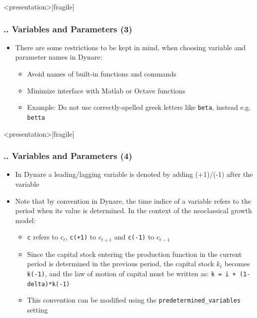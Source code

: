 \documentclass[11pt,aspectratio=169]{beamer}
\begin{document}
\begin{frame}<presentation>[fragile]
	\frametitle{{\thesection.\thesubsection.\thesubsubsection} Variables and Parameters (3)}
	\begin{itemize}
		\item There are some restrictions to be kept in mind, when choosing variable and parameter names in Dynare:
			\begin{itemize} 
				\item Avoid names of built-in functions and commands
				\item Minimize interface with Matlab or Octave functions
				\item Example: Do not use correctly-spelled greek letters like \texttt{beta}, instead \linebreak e.g. \texttt{betta}
			\end{itemize}
	\end{itemize}
\end{frame}
\begin{frame}<presentation>[fragile]
	\frametitle{{\thesection.\thesubsection.\thesubsubsection} Variables and Parameters (4)}
	\begin{itemize}
		\item In Dynare a leading/lagging variable is denoted by adding (+1)/(-1) after the variable
		\item Note that by convention in Dynare, the time indice of a variable refers to the period when its value is determined. In the context of the neoclassical growth model:
		\begin{itemize}
			\item \texttt{c} refers to $c_t$, \texttt{c(+1)} to $c_{t+1}$ and \texttt{c(-1)} to $c_{t-1}$
			\item Since the capital stock entering the production function in the current period is determined in the previous period, the capital stock $k_t$ becomes \texttt{k(-1)}, and the law of motion of capital must be written as: \texttt{k = i + (1-delta)*k(-1)} 
			\item This convention can be modified using the \texttt{predetermined\_variables} setting
		\end{itemize}
	\end{itemize}
\end{frame}
\end{document}
